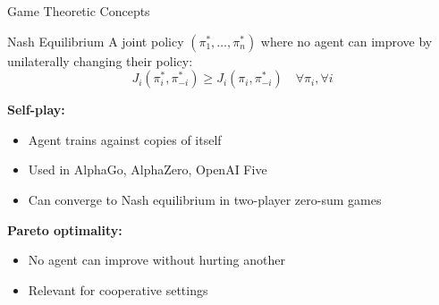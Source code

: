 \documentclass[aspectratio=169]{beamer}
\begin{document}
\begin{frame}{Game Theoretic Concepts}
  \begin{definitionbox}{Nash Equilibrium}
    A joint policy $(\pi_1^*, \ldots, \pi_n^*)$ where no agent can improve by unilaterally changing their policy:
    $$J_i(\pi_i^*, \pi_{-i}^*) \geq J_i(\pi_i, \pi_{-i}^*) \quad \forall \pi_i, \forall i$$
  \end{definitionbox}

  \vspace{0.5em}

  \textbf{Self-play:}
  \begin{itemize}
    \item Agent trains against copies of itself
    \item Used in AlphaGo, AlphaZero, OpenAI Five
    \item Can converge to Nash equilibrium in two-player zero-sum games
  \end{itemize}

  \vspace{0.5em}

  \textbf{Pareto optimality:}
  \begin{itemize}
    \item No agent can improve without hurting another
    \item Relevant for cooperative settings
  \end{itemize}
\end{frame}
\end{document}
